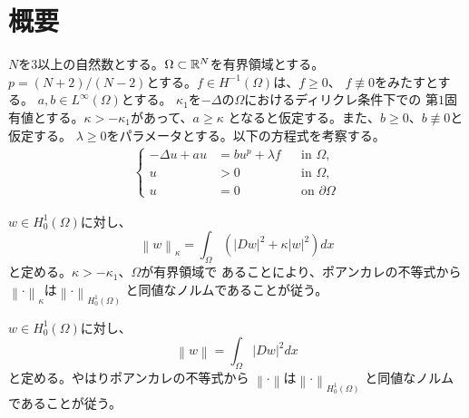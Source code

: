 \section{概要}

$N$を$3$以上の自然数とする。$\Omega \subset \mathbb{R}^N$を有界領域とする。
$p = (N+2)/(N-2)$とする。$f \in H^{-1}(\Omega)$は、$f \geq 0$、
$f \not \equiv 0$をみたすとする。
$a, b \in L^\infty(\Omega)$とする。
$\kappa_1$を$-\Delta$の$\Omega$におけるディリクレ条件下での
第$1$固有値とする。$\kappa > - \kappa_1$があって、$a \geq \kappa$
となると仮定する。また、$b \geq 0$、$b \not \equiv 0$と仮定する。
$\lambda \geq 0$をパラメータとする。以下の方程式を考察する。
\begin{align}
 \left\{
 \begin{aligned}
  -\Delta u + a u &= b u^p + \lambda f  & &\text{in~} \Omega,  \\
  u &> 0 & &\text{in~} \Omega, \\
  u &= 0 & &\text{on~} \partial\Omega
 \end{aligned}
 \right. \tag*{$(\star)_\lambda$} \label{eq:prob_main}
\end{align}

$w \in H_0^1(\Omega)$に対し、
\[
 \left\| w \right\|_\kappa = \int_\Omega \left( \lvert Dw \rvert^2 +
 \kappa \lvert w \rvert^2 \right) dx
\]
と定める。$\kappa > -\kappa_1$、$\Omega$が有界領域で
あることにより、ポアンカレの不等式から
$\left\| \cdot \right\|_\kappa$は$\left\| \cdot
\right\|_{H_0^1(\Omega)}$
と同値なノルムであることが従う。

$w \in H_0^1(\Omega)$に対し、
\[
 \left\| w \right\| = \int_\Omega \lvert Dw \rvert^2 dx
\]
と定める。やはりポアンカレの不等式から
$\left\| \cdot \right\|$は$\left\| \cdot
\right\|_{H_0^1(\Omega)}$
と同値なノルムであることが従う。